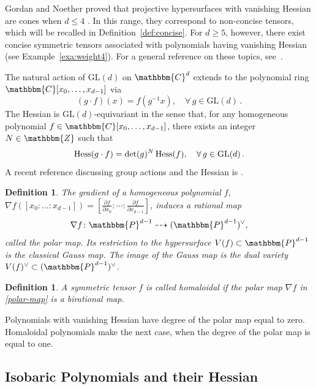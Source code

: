 \documentclass[aps,floatfix,groupedaddress,superscriptaddress,longbibliography,footinbib,notitlepage,showpacs]{revtex4-1}
\def\Hess{{\rm Hess}}
\newtheorem{definition}[theorem]{Definition}
\begin{document}
Gordan and Noether proved that projective hypersurfaces with vanishing Hessian are cones when $d \leq 4$ \cite{GN}. In this range, they correspond to non-concise tensors, which will be recalled in Definition~\ref{def:concise}. For $d\geq 5$, however, there exist concise symmetric tensors associated with polynomials having vanishing Hessian (see Example~\ref{exa:weight4}). For a general reference on these topics, see~\cite{Ru}.

The natural action of $\mathrm{GL}(d)$ on $\mathbbm{C}^d$ extends to the polynomial ring $\mathbbm{C}[x_0,\dots,x_{d-1}]$ via
\begin{equation}
(g\cdot f)(x) = f(g^{-1}x), \quad \forall\, g\in \mathrm{GL}(d)\,.
\end{equation}
The Hessian is $\mathrm{GL}(d)$-equivariant in the sense that, for any homogeneous polynomial $f\in\mathbbm{C}[x_0,\ldots,x_{d-1}]$, there exists an integer $N\in\mathbbm{Z}$ such that
\begin{equation}
\Hess(g \cdot f)=\det(g)^N\,\Hess(f), \quad \forall\, g \in \mathrm{GL}(d)\,.
\end{equation}
A recent reference discussing group actions and the Hessian is \cite{COCDR}.

\begin{definition}
The gradient of a homogeneous polynomial $f$, $\nabla f([x_0:\dots:x_{d-1}]) 
= [ \frac{\partial f}{\partial x_0} : \cdots : \frac{\partial f}{\partial x_{d-1}}]$, induces a rational map 
\begin{equation}\label{polar-map}
\nabla f \colon \mathbbm{P}^{d-1} \dashrightarrow (\mathbbm{P}^{d-1})^\vee,
\end{equation}
called the \emph{polar map}. Its restriction to the hypersurface 
$V(f) \subset \mathbbm{P}^{d-1}$ is the classical Gauss map. The image of the Gauss map is the dual variety $V(f)^\vee \subset (\mathbbm{P}^{d-1})^\vee$.
\end{definition}

\begin{definition}
A symmetric tensor $f$ is called \emph{homaloidal} if the polar map $\nabla f$ in \eqref{polar-map} is a birational map.
\end{definition}

Polynomials with vanishing Hessian have degree of the polar map equal to zero. Homaloidal polynomials make the next case, when the degree of the polar map is equal to one.

\subsection{Isobaric Polynomials and their Hessian}
\end{document}
